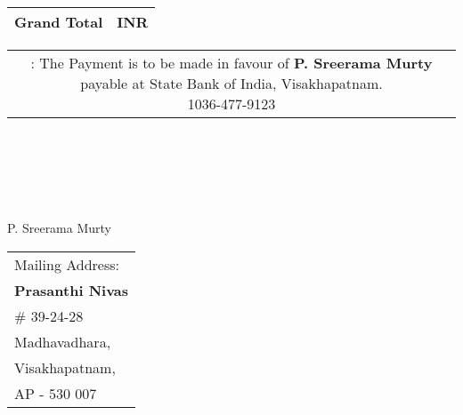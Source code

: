 \documentclass[11pt]{article}
\begin{document}
\vspace*{0.45cm}

\hspace*{11.9cm}
\begin{tabular}{|c|r|}
\hline
{\bf Grand Total} & INR \hspace{1.45cm} \\
\hline
\end{tabular}

\vspace*{-0.45cm}
\hspace*{-0.65cm}
\begin{tabular}{c}
\parbox{4in}{ : The Payment is to be made in favour of {\bf P. Sreerama Murty} payable at State Bank of India, Visakhapatnam. \\
 1036-477-9123}\\
\end{tabular}
\vspace*{75pt}


 \\ \\ \\ \\ \\
 \hspace*{0.2cm}P. Sreerama Murty
\vspace*{-71pt}
\begin{flushright}
\begin{tabular}{l}
Mailing Address:\\
{\bf Prasanthi Nivas}\\
\# 39-24-28\\
Madhavadhara, \\ 
Visakhapatnam, \\
AP - 530 007\\
\end{tabular}
\end{flushright}
\end{document}
